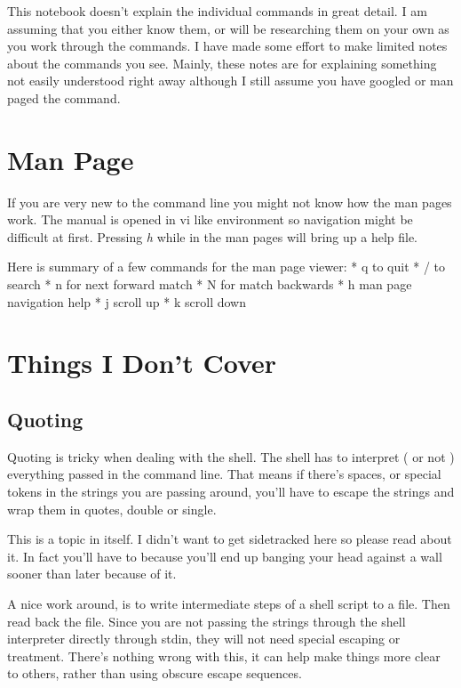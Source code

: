 \documentclass{article}
\begin{document}
    This notebook doesn't explain the individual commands in great detail. I
am assuming that you either know them, or will be researching them on
your own as you work through the commands. I have made some effort to
make limited notes about the commands you see. Mainly, these notes are
for explaining something not easily understood right away although I
still assume you have googled or man paged the command.

    \section{Man Page}\label{man-page}

If you are very new to the command line you might not know how the man
pages work. The manual is opened in vi like environment so navigation
might be difficult at first. Pressing \emph{h} while in the man pages
will bring up a help file.

Here is summary of a few commands for the man page viewer: * q to quit *
/ to search * n for next forward match * N for match backwards * h man
page navigation help * j scroll up * k scroll down

\section{Things I Don't Cover}\label{things-i-dont-cover}

\subsection{Quoting}\label{quoting}

Quoting is tricky when dealing with the shell. The shell has to
interpret ( or not ) everything passed in the command line. That means
if there's spaces, or special tokens in the strings you are passing
around, you'll have to escape the strings and wrap them in quotes,
double or single.

This is a topic in itself. I didn't want to get sidetracked here so
please read about it. In fact you'll have to because you'll end up
banging your head against a wall sooner than later because of it.

A nice work around, is to write intermediate steps of a shell script to
a file. Then read back the file. Since you are not passing the strings
through the shell interpreter directly through stdin, they will not need
special escaping or treatment. There's nothing wrong with this, it can
help make things more clear to others, rather than using obscure escape
sequences.
\end{document}
